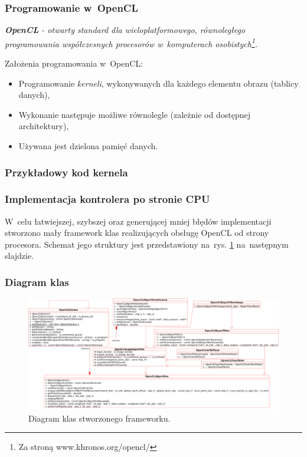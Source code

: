 \documentclass{beamer}
\begin{document}
\begin{frame}
	\frametitle{Programowanie w~OpenCL}
	
	\emph{\textbf{OpenCL} - otwarty standard dla wieloplatformowego, równoległego programowania współczesnych procesorów w~komputerach osobistych\footnote{Za stroną www.khronos.org/opencl/}.}
	
	\vspace{1em}
	
	Założenia programowania w~OpenCL:
	
	\begin{itemize}
	\item Programowanie \emph{kerneli}, wykonywanych dla każdego elementu obrazu (tablicy danych),
	\item Wykonanie następuje możliwe równolegle (zależnie od dostępnej architektury),
	\item Używana jest dzielona pamięć danych.
  \end{itemize}
\end{frame}

\begin{frame}
\frametitle{Przykładowy kod kernela}

\end{frame}

\begin{frame}
  \frametitle{Implementacja kontrolera po stronie CPU}
  W~celu łatwiejszej, szybszej oraz generującej mniej błędów implementacji stworzono mały framework klas realizujących obsługę OpenCL od strony procesora.
Schemat jego struktury jest przedstawiony na~rys. \ref{fig:class_diagram} na~następnym slajdzie.
\end{frame}

\begin{frame}
  \frametitle{Diagram klas}
\begin{figure}
  \centering
  \includegraphics[width=0.9\linewidth]{class_diagram}
  \caption{Diagram klas stworzonego frameworku.}
  \label{fig:class_diagram}
\end{figure}
  
\end{frame}
\end{document}
